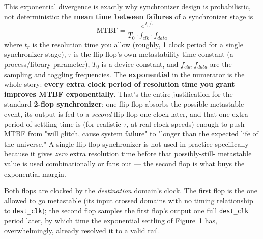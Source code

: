 \documentclass[12pt]{article}
\begin{document}
This exponential divergence is exactly why synchronizer design is
probabilistic, not deterministic: the \textbf{mean time between failures}
of a synchronizer stage is
\[
\text{MTBF} = \frac{e^{\,t_r/\tau}}{T_0 \cdot f_{clk} \cdot f_{data}}
\]
where $t_r$ is the resolution time you allow (roughly, 1 clock period for
a single synchronizer stage), $\tau$ is the flip-flop's own metastability
time constant (a process/library parameter), $T_0$ is a device constant,
and $f_{clk}, f_{data}$ are the sampling and toggling frequencies. The
\textbf{exponential} in the numerator is the whole story: \textbf{every
extra clock period of resolution time you grant improves MTBF
exponentially}. That's the entire justification for the standard
\textbf{2-flop synchronizer}: one flip-flop absorbs the possible
metastable event, its output is fed to a \emph{second} flip-flop one clock
later, and that one extra period of settling time is (for realistic
$\tau$, at real clock speeds) enough to push MTBF from "will glitch, cause
system failure" to "longer than the expected life of the universe." A
single flip-flop synchronizer is not used in practice specifically because
it gives \emph{zero} extra resolution time before that possibly-still-
metastable value is used combinationally or fans out — the second flop is
what buys the exponential margin.

\begin{center}
\end{center}
\begin{center}
\parbox{0.85\linewidth}{\footnotesize\color{MGray}
Both flops are clocked by the \emph{destination} domain's clock. The first
flop is the one allowed to go metastable (its input crossed domains with no
timing relationship to \texttt{dest\_clk}); the second flop samples the
first flop's output one full \texttt{dest\_clk} period later, by which time
the exponential settling of Figure~1 has, overwhelmingly, already resolved
it to a valid rail.}
\end{center}
\end{document}
